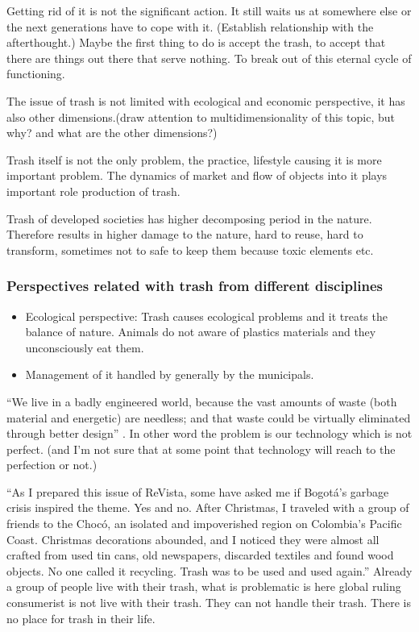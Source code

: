 \documentclass[12pt]{article}
\providecommand{\quotes}[1]{``#1''}
\begin{document}
Getting rid of it is not the significant action. It still waits us at somewhere else or the next generations have to cope with it. (Establish relationship with the afterthought.) Maybe the first thing to do is accept the trash, to accept that there are things out there that serve nothing. To break out of this eternal cycle of functioning.

The issue of trash is not limited with ecological and economic perspective, it has also other dimensions.(draw attention to multidimensionality of this topic, but why? and what are the other dimensions?)

Trash itself is not the only problem, the practice, lifestyle causing it is more important problem. The dynamics of market and flow of objects into it plays important role production of trash.

Trash of developed societies has higher decomposing period in the nature. Therefore results in higher damage to the nature, hard to reuse, hard to transform, sometimes not to safe to keep them because toxic elements etc. 

%
\subsubsection{Perspectives related with trash from different disciplines}
\begin{itemize}
\item Ecological perspective: Trash causes ecological problems and it treats the balance of nature. Animals do not aware of plastics materials and they unconsciously eat them.
\item Management of it handled by generally by the municipals. 
\end{itemize}

\quotes{We live in a badly engineered world, because the vast amounts of waste (both material and energetic) are needless; and that waste could be virtually eliminated through better design} \cite{mcdonough2010cradle}. In other word the problem is our technology which is not perfect. (and I'm not sure that at some point that technology will reach to the perfection or not.)

\quotes{As I prepared this issue of ReVista, some have asked me if Bogotá’s garbage crisis inspired the theme. Yes and no.  After Christmas, I traveled with a group of friends to the Chocó, an isolated and impoverished region on Colombia’s Pacific Coast. Christmas decorations abounded, and I noticed they were almost all crafted from used tin cans, old newspapers, discarded textiles and found wood objects. No one called it recycling. Trash was to be used and used again.}\cite{} Already a group of people live with their trash, what is problematic is here global ruling consumerist is not live with their trash. They can not handle their trash. There is no place for trash in their life.
\end{document}
